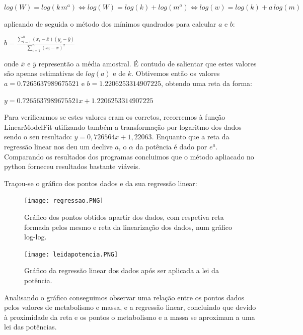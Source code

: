 \documentclass[aps,pre,twocolumn,showpacs,amsmath,amssymb]{revtex4-1}
\begin{document}
    $log(W) = log(k\,m^a) \iff log(W) = log(k) + log(m^a) \iff log(w) = log(k) + a\,log(m)$

    aplicando de seguida o método dos mínimos quadrados para calcular $a$ e $b$:

    \begin{center}
        $b=\frac{\sum^n_{i=1}(x_i - \bar{x})(y_i - \bar{y})}{\sum^n_{i=1}(x_i - \bar{x})^2}$
    \end{center}

    onde $\bar{x}$ e $\bar{y}$ representão a média amostral. É contudo de salientar que estes valores são apenas estimativas de $log(a)$ e de $k$. Obtivemos então os valores $a = 0.7265637989675521$ e $b = 1.2206253314907225$, obtendo uma reta da forma:

    $y = 0.7265637989675521x + 1.2206253314907225$

    Para verificarmos se estes valores eram os corretos, recorremos à função LinearModelFit utilizando também a transformação por logaritmo dos dados sendo o seu resultado: $y = 0, 726564x + 1,22063$. Enquanto que a reta da regressão linear nos deu um declive $a$, o $\alpha$ da potência é dado por $e^a$. Comparando os resultados dos programas concluimos que o método apliacado no python forneceu resultados bastante viáveis.

    Traçou-se o gráfico dos pontos dados e da sua regressão linear:

    \begin{figure}[h!]
        \begin{center}
            \texttt{[image: regressao.PNG]} \\
            \caption{Gráfico dos pontos obtidos apartir dos dados, com respetiva reta formada pelos mesmo e reta da linearização dos dados, num gráfico log-log.}
            \label{fig.exemplo}
        \end{center}
    \end{figure}

    \begin{figure}[h!]
        \begin{center}
            \texttt{[image: leidapotencia.PNG]} \\
            \caption{Gráfico da regressão linear dos dados após ser aplicada a lei da potência.}
            \label{fig.exemplo}
        \end{center}
    \end{figure}


    Analisando o gráfico conseguimos observar uma relação entre os pontos dados pelos valores de metabolismo e massa, e a regressão linear, concluindo que devido à proximidade da reta e os pontos o metabolismo e a massa se aproximam a uma lei das potências.
\end{document}
